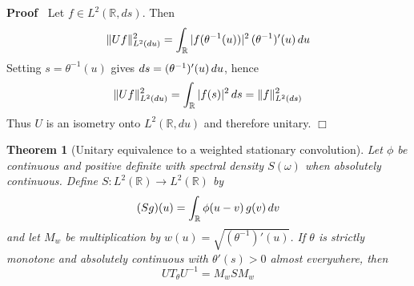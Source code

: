 \documentclass{article}
\newenvironment{proof}{\noindent\textbf{Proof\ }}{\hspace*{\fill}$\Box$\medskip}
{\theorembodyfont{\rmfamily}\newtheorem{example}{Example}}
\newtheorem{theorem}{Theorem}
\begin{document}
\begin{proof}
  Let $f \in L^2 (\mathbb{R}, ds)$. Then
  \begin{equation}
    \|Uf\|_{L^2  (du)}^2 = \int_{\mathbb{R}} |f (\theta^{- 1} (u)) |^2
    \hspace{0.17em} (\theta^{- 1})' (u)  \hspace{0.17em} du
  \end{equation}
  Setting $s = \theta^{- 1} (u)$ gives $ds = (\theta^{- 1})' (u) 
  \hspace{0.17em} du$, hence
  \begin{equation}
    \|Uf\|_{L^2  (du)}^2 = \int_{\mathbb{R}} |f (s) |^2  \hspace{0.17em} ds =
    \|f\|_{L^2  (ds)}^2
  \end{equation}
  Thus $U$ is an isometry onto $L^2 (\mathbb{R}, du)$ and therefore unitary.
\end{proof}

\begin{theorem}[Unitary equivalence to a weighted stationary convolution]
  Let $\phi$ be continuous and positive definite with spectral density $S
  (\omega)$ when absolutely continuous. Define $S : L^2 (\mathbb{R}) \to L^2
  (\mathbb{R})$ by
  \begin{equation}
    (Sg) (u) = \int_{\mathbb{R}} \phi (u - v)  \hspace{0.17em} g (v) 
    \hspace{0.17em} dv
  \end{equation}
  and let $M_w$ be multiplication by $w (u) = \sqrt{(\theta^{- 1})' (u)}$. If
  $\theta$ is strictly monotone and absolutely continuous with $\theta' (s) >
  0$ almost everywhere, then
  \begin{equation}
    UT_{\theta} U^{- 1} = M_w SM_w
  \end{equation}
\end{theorem}
\end{document}
